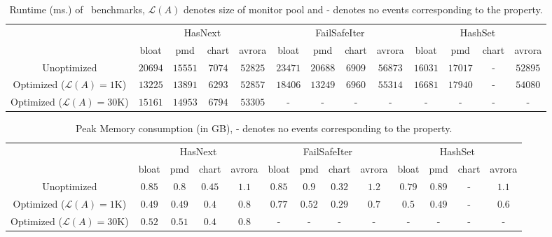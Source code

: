 \begin{table*}[!ht]
\centering
\small
\begin{tabular}{|c|c|c|c|c||c|c|c|c||c|c|c|c|}
\hline
  \multirow{2}{*}{}                                 & 
\multicolumn{4}{c||}{HasNext}           & \multicolumn{4}{c||}{FailSafeIter}
   &    \multicolumn{4}{c|}{HashSet}
      \\ \cline{2-13}                                              
           
           
 & bloat & pmd & chart & avrora & bloat & pmd & chart & avrora& bloat
 & pmd & chart & avrora\\ \hline
 
  Unoptimized  & $20694$ & $15551$ & $7074$ & $52825$ & $23471$ & $20688$ &
  $6909$ & $56873$ & $16031$ & $17017$ & - & $52895$\\\hline
 
 Optimized ($\mathcal{L}(A) = 1$K)  & $13225$ & $13891$ & $6293$ & $52857$ &
 $18406$ & $13249$ & $6960$ & $55314$ & $16681$ & $17940$ & - & $54080$\\\hline
  
  Optimized ($\mathcal{L}(A) = 30$K)  & $15161$ & $14953$ & $6794$ & $53305$ &
  - & - & - & - & - & - & - & -\\\hline
     

\end{tabular}
\caption{Runtime (ms.) of \dacapo\ benchmarks, $\mathcal{L}(A)$ denotes
size of monitor pool and - denotes no events corresponding to the property.}
\label{table:time}
\end{table*}


\begin{table*}[!ht]
\centering
\small
\begin{tabular}{|c|c|c|c|c||c|c|c|c||c|c|c|c|}
\hline
  \multirow{2}{*}{}                                 & 
\multicolumn{4}{c||}{HasNext}           & \multicolumn{4}{c||}{FailSafeIter}
   &    \multicolumn{4}{c|}{HashSet}
      \\ \cline{2-13}                                              
           
           
 & bloat & pmd & chart & avrora & bloat & pmd & chart & avrora& bloat
 & pmd & chart & avrora\\ \hline
 
  Unoptimized  & $0.85$ & $0.8$ & $0.45$ & $1.1$ & 
              $0.85$ & $0.9$ & $0.32$ & $1.2$ & 
              $0.79$ & $0.89$ & - & $1.1$\\\hline
 
 Optimized ($\mathcal{L}(A) = 1$K)  & 
 			$0.49$ & $0.49$ & $0.4$ & $0.8$ &
 			  $0.77$ & $0.52$ & $0.29$ & $0.7$ & 
 			  $0.5$ & $0.49$ & - & $0.6$\\\hline
  
  Optimized ($\mathcal{L}(A) = 30$K)  & 
  $0.52$ & $0.51$ & $0.4$ & $0.8$ &
  - & - & - & - &
   - & - & - & -\\\hline
     

\end{tabular}
\caption{Peak Memory consumption (in GB), - denotes no events corresponding to
the property.}
\label{table:memory}
\end{table*}



